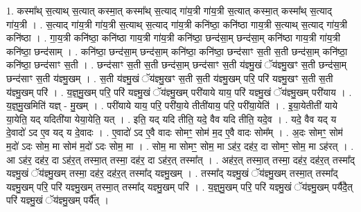 \documentclass[17pt]{extarticle}
\begin{document}
1. कस्मा᳚थ् स॒त्याथ् स॒त्यात् कस्मा॒त् कस्मा᳚थ् स॒त्याद् गा॑य॒त्री गा॑य॒त्री स॒त्यात् कस्मा॒त् कस्मा᳚थ् स॒त्याद् गा॑य॒त्री । . स॒त्याद् गा॑य॒त्री गा॑य॒त्री स॒त्याथ् स॒त्याद् गा॑य॒त्री कनि॑ष्ठा॒ कनि॑ष्ठा गाय॒त्री स॒त्याथ् स॒त्याद् गा॑य॒त्री कनि॑ष्ठा । . गा॒य॒त्री कनि॑ष्ठा॒ कनि॑ष्ठा गाय॒त्री गा॑य॒त्री कनि॑ष्ठा॒ छन्द॑सा॒म् छन्द॑सा॒म् कनि॑ष्ठा गाय॒त्री गा॑य॒त्री कनि॑ष्ठा॒ छन्द॑साम् । . कनि॑ष्ठा॒ छन्द॑सा॒म् छन्द॑सा॒म् कनि॑ष्ठा॒ कनि॑ष्ठा॒ छन्द॑साꣳ स॒ती स॒ती छन्द॑सा॒म् कनि॑ष्ठा॒ कनि॑ष्ठा॒ छन्द॑साꣳ स॒ती । . छन्द॑साꣳ स॒ती स॒ती छन्द॑सा॒म् छन्द॑साꣳ स॒ती य॑ज्ञ्मु॒खं ॅय॑ज्ञ्मु॒खꣳ स॒ती छन्द॑सा॒म् छन्द॑साꣳ स॒ती य॑ज्ञ्मु॒खम् । . स॒ती य॑ज्ञ्मु॒खं ॅय॑ज्ञ्मु॒खꣳ स॒ती स॒ती य॑ज्ञ्मु॒खम् परि॒ परि॑ यज्ञ्मु॒खꣳ स॒ती स॒ती य॑ज्ञ्मु॒खम् परि॑ । . य॒ज्ञ्॒मु॒खम् परि॒ परि॑ यज्ञ्मु॒खं ॅय॑ज्ञ्मु॒खम् परी॑याये याय॒ परि॑ यज्ञ्मु॒खं ॅय॑ज्ञ्मु॒खम् परी॑याय । . य॒ज्ञ्॒मु॒खमिति॑ यज्ञ् - मु॒खम् । . परी॑याये याय॒ परि॒ परी॑या॒ये तीती॑याय॒ परि॒ परी॑या॒येति॑ । . इ॒या॒येतीती॑ याये या॒येति॒ यद् यदिती॑या येया॒येति॒ यत् । . इति॒ यद् यदि तीति॒ यदे॒ वैव यदि तीति॒ यदे॒व । . यदे॒ वैव यद् य दे॒वादो॑ ऽद ए॒व यद् य दे॒वादः । . ए॒वादो॑ ऽद ए॒वै वादः सोमꣳ॒॒ सोम॑ म॒द ए॒वै वादः सोम᳚म् । . अ॒दः सोमꣳ॒॒ सोम॑ म॒दो॑ ऽदः सोम॒ मा सोम॑ म॒दो॑ ऽदः सोम॒ मा । . सोम॒ मा सोमꣳ॒॒ सोम॒ मा ऽह॑र॒ दह॑र॒ दा सोमꣳ॒॒ सोम॒ मा ऽह॑रत् । . आ ऽह॑र॒ दह॑र॒ दा ऽह॑र॒त् तस्मा॒त् तस्मा॒ दह॑र॒ दा ऽह॑र॒त् तस्मा᳚त् । . अह॑र॒त् तस्मा॒त् तस्मा॒ दह॑र॒ दह॑र॒त् तस्मा᳚द् यज्ञ्मु॒खं ॅय॑ज्ञ्मु॒खम् तस्मा॒ दह॑र॒ दह॑र॒त् तस्मा᳚द् यज्ञ्मु॒खम् । . तस्मा᳚द् यज्ञ्मु॒खं ॅय॑ज्ञ्मु॒खम् तस्मा॒त् तस्मा᳚द् यज्ञ्मु॒खम् परि॒ परि॑ यज्ञ्मु॒खम् तस्मा॒त् तस्मा᳚द् यज्ञ्मु॒खम् परि॑ । . य॒ज्ञ्॒मु॒खम् परि॒ परि॑ यज्ञ्मु॒खं ॅय॑ज्ञ्मु॒खम् पर्यै॑दै॒त् परि॑ यज्ञ्मु॒खं ॅय॑ज्ञ्मु॒खम् पर्यै᳚त् । \newline
\end{document}
